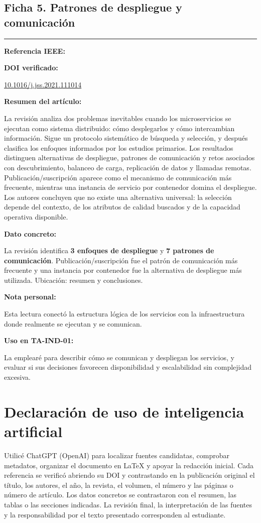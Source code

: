 \documentclass[12pt,a4paper]{article}
\newcommand{\ficha}[7]{%
  \subsection*{#1}
  {\color{azul}\rule{\linewidth}{0.8pt}}

  \textbf{Referencia IEEE:}

  \fullcite{#2}

  \textbf{DOI verificado:}

  \href{https://doi.org/#3}{#3}

  \textbf{Resumen del art\'iculo:}

  #4

  \textbf{Dato concreto:}

  #5

  \textbf{Nota personal:}

  #6

  \textbf{Uso en TA-IND-01:}

  #7

  \vspace{6mm}
}
\begin{document}
\ficha
{Ficha 5. Patrones de despliegue y comunicaci\'on}
{aksakalli2021patterns}
{10.1016/j.jss.2021.111014}
{La revisi\'on analiza dos problemas inevitables cuando los microservicios se ejecutan como sistema distribuido: c\'omo desplegarlos y c\'omo intercambian informaci\'on. Sigue un protocolo sistem\'atico de b\'usqueda y selecci\'on, y despu\'es clasifica los enfoques informados por los estudios primarios. Los resultados distinguen alternativas de despliegue, patrones de comunicaci\'on y retos asociados con descubrimiento, balanceo de carga, replicaci\'on de datos y llamadas remotas. Publicaci\'on/suscripci\'on aparece como el mecanismo de comunicaci\'on m\'as frecuente, mientras una instancia de servicio por contenedor domina el despliegue. Los autores concluyen que no existe una alternativa universal: la selecci\'on depende del contexto, de los atributos de calidad buscados y de la capacidad operativa disponible.}
{La revisi\'on identifica \textbf{3 enfoques de despliegue} y \textbf{7 patrones de comunicaci\'on}. Publicaci\'on/suscripci\'on fue el patr\'on de comunicaci\'on m\'as frecuente y una instancia por contenedor fue la alternativa de despliegue m\'as utilizada. Ubicaci\'on: resumen y conclusiones.}
{Esta lectura conect\'o la estructura l\'ogica de los servicios con la infraestructura donde realmente se ejecutan y se comunican.}
{La emplear\'e para describir c\'omo se comunican y despliegan los servicios, y evaluar si sus decisiones favorecen disponibilidad y escalabilidad sin complejidad excesiva.}

\newpage
\printbibliography[title={Referencias bibliogr\'aficas}]

\section*{Declaraci\'on de uso de inteligencia artificial}

Utilic\'e ChatGPT (OpenAI) para localizar fuentes candidatas, comprobar metadatos, organizar el documento en LaTeX y apoyar la redacci\'on inicial. Cada referencia se verific\'o abriendo su DOI y contrastando en la publicaci\'on original el t\'itulo, los autores, el a\~no, la revista, el volumen, el n\'umero y las p\'aginas o n\'umero de art\'iculo. Los datos concretos se contrastaron con el resumen, las tablas o las secciones indicadas. La revisi\'on final, la interpretaci\'on de las fuentes y la responsabilidad por el texto presentado corresponden al estudiante.
\end{document}
